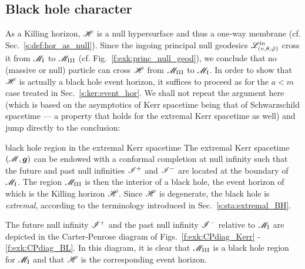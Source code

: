 \subsection{Black hole character} \label{s:exk:bhole_char}

As a Killing horizon, $\mathscr{H}$ is a null hypersurface and thus a one-way membrane
(cf. Sec.~\ref{s:def:hor_as_null}).
Since the ingoing principal null geodesics $\mathscr{L}^{\rm in}_{(v,\theta,{\tilde\varphi})}$
cross it from $\mathscr{M}_{\rm I}$ to $\mathscr{M}_{\rm III}$ (cf. Fig.~\ref{f:exk:princ_null_geod}),
we conclude that no (massive or null) particle can cross $\mathscr{H}$ from $\mathscr{M}_{\rm III}$
to $\mathscr{M}_{\rm I}$.
In order to show that $\mathscr{H}$ is actually a black hole event horizon,
it suffices to proceed as for the $a<m$ case treated in Sec.~\ref{s:ker:event_hor}.
We shall not repeat the argument here (which is based on the
asymptotics of Kerr spacetime being that of Schwarzschild spacetime --- a property
that holds for the extremal Kerr spacetime as well) and jump directly to the conclusion:

\begin{tprop}{black hole region in the extremal Kerr spacetime}{}
The extremal Kerr spacetime $(\mathscr{M}, \bm{g})$ can be endowed with a conformal
completion at null infinity such that the future and past null infinities $\mathscr{I}^+$
and $\mathscr{I}^-$ are located at the boundary of $\mathscr{M}_{\rm I}$. The region $\mathscr{M}_{\rm III}$ is
then the interior of a black hole, the event horizon of which is
the Killing horizon $\mathscr{H}$. Since $\mathscr{H}$ is degenerate, the black hole
is \emph{extremal},
according to the terminology introduced in Sec.~\ref{s:sta:extremal_BH}.
\end{tprop}

The future null infinity $\mathscr{I}^+$ and the past null infinity $\mathscr{I}^-$
relative to $\mathscr{M}_{\rm I}$ are depicted in the Carter-Penrose diagram of
Figs.~\ref{f:exk:CPdiag_Kerr} -\ref{f:exk:CPdiag_BL}. In this diagram,
it is clear that $\mathscr{M}_{\rm III}$ is a black hole region for $\mathscr{M}_{\rm I}$
and that $\mathscr{H}$ is the corresponding event horizon.

